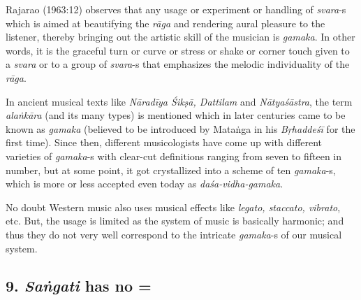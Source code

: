 Rajarao (1963:12) observes that any usage or experiment or handling of \textit{svara}-s which is aimed at beautifying the \textit{rāga} and rendering aural pleasure to the listener, thereby bringing out the artistic skill of the musician is \textit{gamaka}. In other words, it is the graceful turn or curve or stress or shake or corner touch given to a \textit{svara} or to a group of \textit{svara}-s that emphasizes the melodic individuality of the \textit{rāga}.

In ancient musical texts like \textit{Nāradīya Śikṣā, Dattilam} and \textit{Nātyaśāstra}, the term \textit{alaṅkāra} (and its many types) is mentioned which in later centuries came to be known as \textit{gamaka} (believed to be introduced by Mataṅga in his \textit{Bṛhaddeśī} for the first time). Since then, different musicologists have come up with different varieties of \textit{gamaka}-s with clear-cut definitions ranging from seven to fifteen in number, but at some point, it got crystallized into a scheme of ten \textit{gamaka}-s, which is more or less accepted even today as \textit{daśa-vidha-gamaka}.

No doubt Western music also uses musical effects like \textit{legato, staccato, vibrato}, etc. But, the usage is limited as the system of music is basically harmonic; and thus they do not very well correspond to the intricate \textit{gamaka}-s of our musical system.


\subsection*{9. \textit{Saṅgati} has no =}

